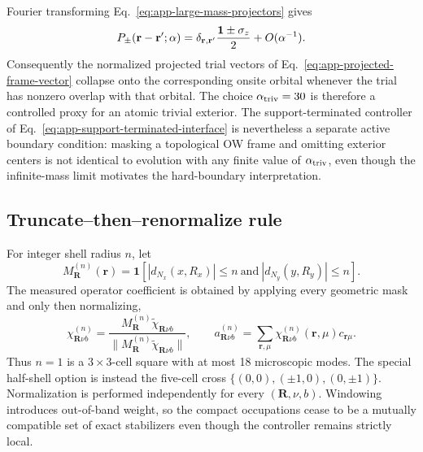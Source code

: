Fourier transforming Eq.~\eqref{eq:app-large-mass-projectors} gives
\begin{equation}
    P_\pm(\mathbf r-\mathbf r';\alpha)
    =\delta_{\mathbf r,\mathbf r'}
      \frac{\mathbf{1}\pm\sigma_z}{2}+O(\alpha^{-1}).
    \label{eq:app-atomic-projector-kernel}
\end{equation}
Consequently the normalized projected trial vectors of
Eq.~\eqref{eq:app-projected-frame-vector} collapse onto the corresponding
onsite orbital whenever the trial has nonzero overlap with that orbital.  The
choice \(\alpha_{\rm triv}=30\) is therefore a controlled proxy for an atomic
trivial exterior.  The support-terminated controller of
Eq.~\eqref{eq:app-support-terminated-interface} is nevertheless a separate
active boundary condition: masking a topological OW frame and omitting
exterior centers is not identical to evolution with any finite value of
\(\alpha_{\rm triv}\), even though the infinite-mass limit motivates the
hard-boundary interpretation.

\subsection{Truncate--then--renormalize rule}

For integer shell radius \(n\), let
\begin{equation}
    M_{\mathbf R}^{(n)}(\mathbf r)
    =\mathbf 1\!\left[
      |d_{N_x}(x,R_x)|\leq n\ \text{and}\
      |d_{N_y}(y,R_y)|\leq n\right].
    \label{eq:app-square-support}
\end{equation}
The measured operator coefficient is obtained by applying every geometric
mask and only then normalizing,
\begin{equation}
    \chi^{(n)}_{\mathbf R\nu b}
    =\frac{M_{\mathbf R}^{(n)}\widetilde\chi_{\mathbf R\nu b}}
    {\|M_{\mathbf R}^{(n)}\widetilde\chi_{\mathbf R\nu b}\|},
    \qquad
    a^{(n)}_{\mathbf R\nu b}
    =\sum_{\mathbf r,\mu}
      \chi^{(n)}_{\mathbf R\nu b}(\mathbf r,\mu)c_{\mathbf r\mu}.
    \label{eq:app-finite-support-frame}
\end{equation}
Thus \(n=1\) is a \(3\times3\)-cell square with at most 18 microscopic
modes.  The special half-shell option is instead the five-cell cross
\(\{(0,0),(\pm1,0),(0,\pm1)\}\).  Normalization is performed independently
for every \((\mathbf R,\nu,b)\).  Windowing introduces out-of-band weight,
so the compact occupations cease to be a mutually compatible set of exact
stabilizers even though the controller remains strictly local.

